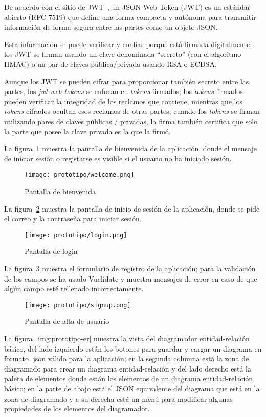 De acuerdo con el sitio de JWT~\cite{jwt_web_2020}, un JSON Web Token (JWT) es un estándar abierto (RFC 7519) que define una forma compacta y autónoma para transmitir información de forma segura entre las partes como un objeto JSON.


Esta información se puede verificar y confiar porque está firmada digitalmente; los JWT se firman usando un clave denominada ``secreto'' (con el algoritmo HMAC) o un par de claves pública/privada usando RSA o ECDSA.

Aunque los JWT se pueden cifrar para proporcionar también secreto entre las partes, los \textit{jwt web tokens} se enfocan en \textit{tokens} firmados; los \textit{tokens} firmados pueden verificar la integridad de los reclamos que contiene, mientras que los \textit{tokens} cifrados ocultan esos reclamos de otras partes; cuando los \textit{tokens} se firman utilizando pares de claves públicas / privadas, la firma también certifica que solo la parte que posee la clave privada es la que la firmó.


La figura~\ref{img:prototipo-welcome} muestra la pantalla de bienvenida de la aplicación, donde el mensaje de iniciar sesión o registarse es visible si el usuario no ha iniciado sesión.

\begin{figure}[H] 
    \centering
    \texttt{[image: prototipo/welcome.png]}
    \caption{Pantalla de bienvenida}
    \label{img:prototipo-welcome}
\end{figure}

La figura~\ref{img:prototipo-login} muestra la pantalla de inicio de sesión de la aplicación, donde se pide el correo y la contraseña para iniciar sesión.


\begin{figure}[H] 
    \centering
    \texttt{[image: prototipo/login.png]}
    \caption{Pantalla de login}
    \label{img:prototipo-login}
\end{figure}
La figura~\ref{img:prototipo-signup} muestra el formulario de registro de la aplicación; para la validación de los campos se ha usado Vuelidate y muestra mensajes de error en caso de que algún campo esté rellenado incorrectamente.


\begin{figure}[H] 
    \centering
    \texttt{[image: prototipo/signup.png]}
    \caption{Pantalla de alta de usuario}
    \label{img:prototipo-signup}
\end{figure}
La figura~\ref{img:prototipo-er} muestra la vista del diagramador entidad-relación básico, del lado izquierdo están los botones para guardar y cargar un diagrama en formato .json válido para la aplicación; en la segunda columna está la zona de diagramado para crear un diagrama entidad-relación y del lado derecho está la paleta de elementos donde están los elementos de un diagrama entidad-relación básico; en la parte de abajo está el JSON equivalente del diagrama que está en la zona de diagramado y a su derecha está un menú para modificar algunas propiedades de los elementos del diagramador.

